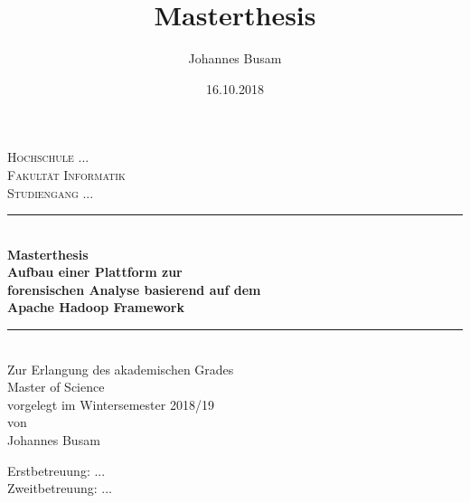 \documentclass[11pt,a4paper]{report} %
\author{Johannes Busam}
\title{Masterthesis}
\date{16.10.2018}
\begin{document}



\begin{titlepage}

\newcommand{\HRule}{\rule{\linewidth}{0.5mm}} %

\center %
 

\textsc{\LARGE Hochschule ...}\\[0.6cm] %
\textsc{\Large Fakultät Informatik}\\ 
\textsc{\Large Studiengang ...}\\ %


\HRule \\[0.5cm]
{ \large \bfseries Masterthesis}\\[0.75cm] %
{ \huge \bfseries Aufbau einer Plattform zur\\ forensischen Analyse basierend auf dem\\ Apache Hadoop\textsuperscript{\textregistered} Framework}\\[0.5cm] %
\HRule \\[0.5cm]
 

\Large Zur Erlangung des akademischen Grades\\
\Large Master of Science\\[0.5cm] 

\Large vorgelegt im Wintersemester 2018/19\\[0.5cm] 

\Large von\\ Johannes Busam 

\begin{flushleft}
Erstbetreuung: ...\\[0.3cm] 

\noindent
Zweitbetreuung: ...\\

\end{flushleft}

\vfill %

\end{titlepage}
\end{document}
